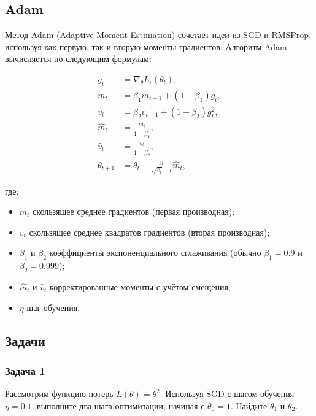\subsection{Adam}

Метод Adam (Adaptive Moment Estimation) сочетает идеи из SGD и RMSProp, используя как первую, так и вторую моменты градиентов. Алгоритм Adam вычисляется по следующим формулам:

\begin{align}
	g_t          & = \nabla_\theta L_i(\theta_t),                                   \\
	m_t          & = \beta_1 m_{t-1} + (1 - \beta_1) g_t,                           \\
	v_t          & = \beta_2 v_{t-1} + (1 - \beta_2) g_t^2,                         \\
	\hat{m}_t    & = \frac{m_t}{1 - \beta_1^t},                                     \\
	\hat{v}_t    & = \frac{v_t}{1 - \beta_2^t},                                     \\
	\theta_{t+1} & = \theta_t - \frac{\eta}{\sqrt{\hat{v}_t} + \epsilon} \hat{m}_t,
\end{align}

где:
\begin{itemize}
	\item $m_t$ \textendash{} скользящее среднее градиентов (первая производная);
	\item $v_t$ \textendash{} скользящее среднее квадратов градиентов (вторая производная);
	\item $\beta_1$ и $\beta_2$ \textendash{} коэффициенты экспоненциального сглаживания (обычно $\beta_1 = 0.9$ и $\beta_2 = 0.999$);
	\item $\hat{m}_t$ и $\hat{v}_t$ \textendash{} корректированные моменты с учётом смещения;
	\item $\eta$ \textendash{} шаг обучения.
\end{itemize}

\subsection{Задачи}

\subsubsection*{Задача 1}
Рассмотрим функцию потерь $L(\theta) = \theta^2$. Используя SGD с шагом обучения $\eta = 0.1$, выполните два шага оптимизации, начиная с $\theta_0 = 1$. Найдите $\theta_1$ и $\theta_2$.

